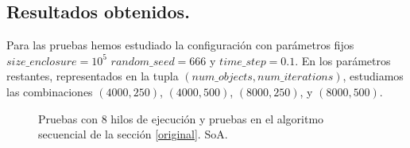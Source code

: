 \documentclass{article}
\begin{document}
\subsection{Resultados obtenidos.}
Para las pruebas hemos estudiado la configuración con parámetros fijos ${size\_enclosure}=10^5$ ${random\_seed}=666$ y
${time\_step}=0.1$. En los parámetros restantes, representados en la tupla $({num\_objects}, {num\_iterations})$,
estudiamos las combinaciones $(4000, 250)$, $(4000, 500)$, $(8000, 250)$, y $(8000, 500)$.

\begin{figure}[htp]
	\hspace*{-3.5cm}
	\caption{Pruebas con 8 hilos de ejecución y pruebas en el algoritmo secuencial de la sección \ref{original}. SoA.}
\end{figure}
\end{document}
